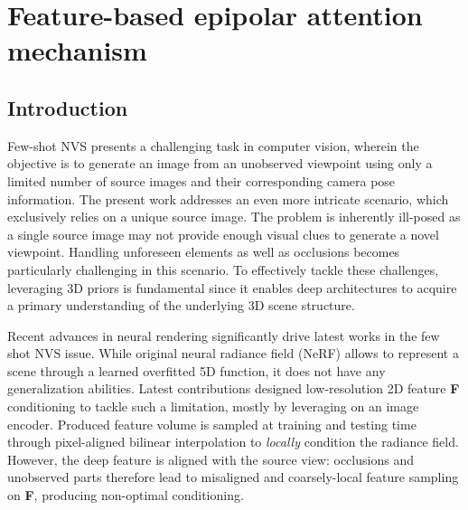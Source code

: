 \chapter{Feature-based epipolar attention mechanism}
\label{chapter:epinerf}





\section{Introduction}
\label{sec:epinerf/intro}
Few-shot NVS presents a challenging task in computer vision, wherein the objective is to generate an image from an unobserved viewpoint using only a limited number of source images and their corresponding camera pose information. The present work addresses an even more intricate scenario, which exclusively relies on a unique source image. The problem is inherently ill-posed as a single source image may not provide enough visual clues to generate a novel viewpoint. Handling unforeseen elements as well as occlusions becomes particularly challenging in this scenario. To effectively tackle these challenges, leveraging 3D priors \citep{saito2019pifu,johari2022geonerf} is fundamental since it enables deep architectures to acquire a primary understanding of the underlying 3D scene structure. 

Recent advances in neural rendering \citep{tewari2022advances} significantly drive latest works in the few shot NVS issue. While original neural radiance field (NeRF) \citep{mildenhall2020nerf} allows to represent a scene through a learned overfitted 5D function, it does not have any generalization abilities. Latest contributions \citep{yu2021pixelnerf,li2022symmnerf,lin2023vision} designed low-resolution 2D feature \textbf{F} conditioning to tackle such a limitation, mostly by leveraging on an image encoder. Produced feature volume is sampled at training and testing time through pixel-aligned bilinear interpolation to \textit{locally} condition the radiance field. However, the deep feature is aligned with the source view: occlusions and unobserved parts therefore lead to misaligned and coarsely-local feature sampling on \textbf{F}, producing non-optimal conditioning. 

